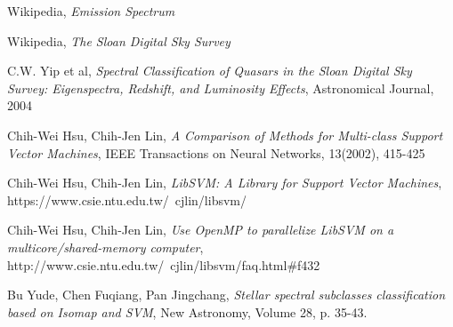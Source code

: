 \documentclass[a4paper,10pt]{article}
\begin{document}
\begin{thebibliography}{9}
    Wikipedia,
    \emph{Emission Spectrum}
    
    Wikipedia,
    \emph{The Sloan Digital Sky Survey}
    
    C.W. Yip et al,
    \emph{Spectral Classification of Quasars in the Sloan Digital Sky Survey: Eigenspectra, Redshift, and Luminosity Effects},
    Astronomical Journal,
    2004
    
    Chih-Wei Hsu, Chih-Jen Lin,
    \emph{A Comparison of Methods for Multi-class Support Vector Machines},
    IEEE Transactions on Neural Networks, 13(2002), 415-425
    
    Chih-Wei Hsu, Chih-Jen Lin,
    \emph{LibSVM: A Library for Support Vector Machines},
    https://www.csie.ntu.edu.tw/~cjlin/libsvm/
    
    Chih-Wei Hsu, Chih-Jen Lin,
    \emph{Use OpenMP to parallelize LibSVM on a multicore/shared-memory computer},
    http://www.csie.ntu.edu.tw/~cjlin/libsvm/faq.html\#f432
    
    Bu Yude, Chen Fuqiang, Pan Jingchang,
    \emph{Stellar spectral subclasses classification based on Isomap and SVM},
    New Astronomy, Volume 28, p. 35-43.
\end{thebibliography}
\end{document}
